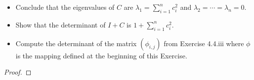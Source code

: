 \documentclass[../psets.tex]{subfiles}
\begin{document}
\begin{enumerate}[label={\textbf{4.4.\roman*.}}]
\begin{itemize}[label={\scriptsize$\blacktriangleright$}]
        \item Conclude that the eigenvalues of $C$ are $\lambda_1=\sum_{i=1}^nc_i^2$ and $\lambda_2=\cdots=\lambda_n=0$.
        \item Show that the determinant of $I+C$ is $1+\sum_{i=1}^nc_i^2$.
        \item Compute the determinant of the matrix $(\phi_{i,j})$ from Exercise 4.4.iii where $\phi$ is the mapping defined at the beginning of this Exercise.
    \end{itemize}
    \begin{proof}



\end{proof}
\end{enumerate}
\end{document}
